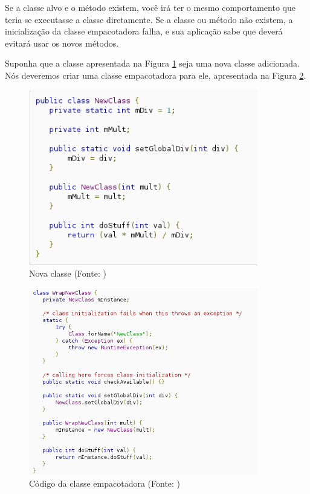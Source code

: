 Se a classe alvo e o método existem, você irá ter o mesmo comportamento que teria se 
executasse a classe diretamente. Se a classe ou método não existem, a inicialização
da classe empacotadora falha, e sua aplicação sabe que deverá evitará usar os novos 
métodos.

Suponha que a classe apresentada na Figura \ref{wrapper1} seja uma nova classe adicionada.
Nós deveremos criar uma classe empacotadora para ele, apresentada na Figura \ref{wrapper2}.

\begin{figure}[h]
    \centering
    \includegraphics[width=10cm]{img/wrapper1}
    \caption[Código da nova classe]{Nova classe (Fonte: \cite{back_compat})}
    \label{wrapper1}
\end{figure}

\begin{figure}[h]
    \centering
    \includegraphics[width=10cm]{img/wrapper2}
    \caption[Código da classe empacotadora]{Código da classe empacotadora (Fonte: \cite{back_compat})}
    \label{wrapper2}
\end{figure}

